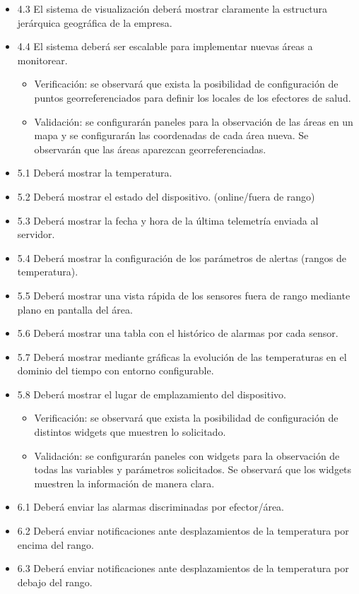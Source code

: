 \documentclass[11pt]{proyecto}
\begin{document}
\begin{itemize}
\item 4.3 El sistema de visualización deberá mostrar claramente la estructura jerárquica geográfica de la empresa.	
\item 4.4 El sistema deberá ser escalable para implementar nuevas áreas a monitorear.
\begin{itemize}
\item Verificación: se observará que exista la posibilidad de configuración de puntos georreferenciados para definir los locales de los efectores de salud.
\item Validación: se configurarán paneles para la observación de las áreas en un mapa y se configurarán las coordenadas de cada área nueva. Se observarán que las áreas aparezcan georreferenciadas.
\end{itemize}

\item 5.1 Deberá mostrar la temperatura.
\item 5.2 Deberá mostrar el estado del dispositivo. (online/fuera de rango)
\item 5.3 Deberá mostrar la fecha y hora de la última telemetría enviada al servidor.
\item 5.4 Deberá mostrar la configuración de los parámetros de alertas (rangos de temperatura).
\item 5.5 Deberá mostrar una vista rápida de los sensores fuera de rango mediante plano en pantalla del área.
\item 5.6 Deberá mostrar una tabla con el histórico de alarmas por cada sensor.
\item 5.7 Deberá mostrar mediante gráficas la evolución de las temperaturas en el dominio del tiempo con entorno configurable.
\item 5.8 Deberá mostrar el lugar de emplazamiento del dispositivo.
\begin{itemize}
\item Verificación: se observará que exista la posibilidad de configuración de distintos widgets que muestren lo solicitado.
\item Validación: se configurarán paneles con widgets para la observación de todas las variables y parámetros solicitados. Se observará que los widgets muestren la información de manera clara.
\end{itemize}    
  
\item 6.1 Deberá enviar las alarmas discriminadas por efector/área.
\item 6.2 Deberá enviar notificaciones ante desplazamientos de la temperatura por encima del rango.
\item 6.3 Deberá enviar notificaciones ante desplazamientos de la temperatura por debajo del rango.
 

\end{itemize}
\end{document}
